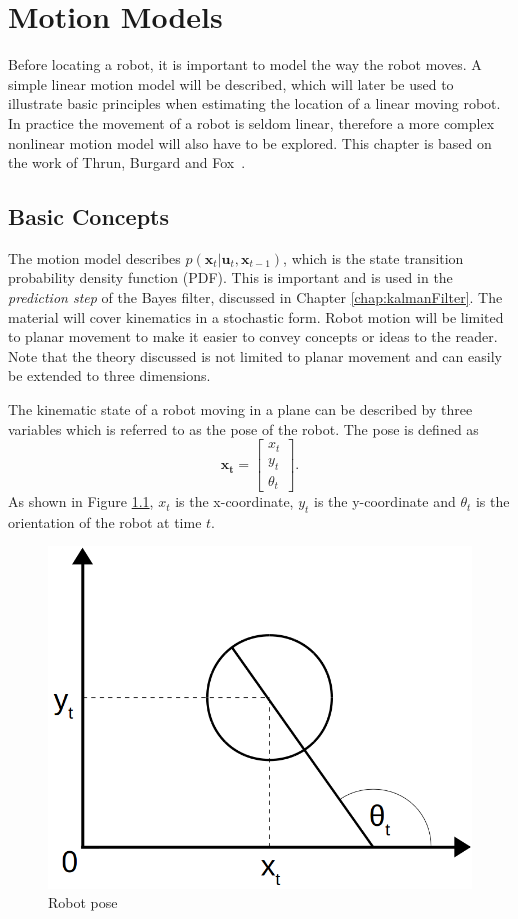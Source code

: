 \documentclass[12pt,oneside,openany,a4paper, %
afrikaans,english,
]{memoir}
\numberwithin{equation}{chapter}
\begin{document}
\chapter{Motion Models}\label{chap:motionModel}
Before locating a robot, it is important to model the way the robot moves. A simple linear motion model will be described, which will later be used to illustrate basic principles when estimating the location of a linear moving robot. In practice the movement of a robot is seldom linear, therefore a more complex nonlinear motion model will also have to be explored. This chapter is based on the work of Thrun, Burgard and Fox~\citep{thrun}.
\section{Basic Concepts}
The motion model describes $p(\bm{x}_t|\bm{u}_t,\bm{x}_{t-1})$, which is the state transition probability density function (PDF). This is important and is used in the \textit{prediction step} of the Bayes filter, discussed in Chapter \ref{chap:kalmanFilter}. The material will cover kinematics in a stochastic form. Robot motion will be limited to planar movement to make it easier to convey concepts or ideas to the reader. Note that the theory discussed is not limited to planar movement and can easily be extended to three dimensions.

The kinematic state of a robot moving in a plane can be described by three variables which is referred to as the pose of the robot.
The pose is defined as
\begin{equation}
\bm{x_t} =
\begin{bmatrix}
x_t\\
y_t\\
\theta_t
\end{bmatrix}.
\end{equation}
As shown in Figure \ref{fig:pose_robot}, $x_t$ is the x-coordinate, $y_t$ is the y-coordinate and $\theta_t$ is the orientation of the robot at time $t$.

\begin{figure}[H]
  \includegraphics[width=0.4\linewidth]{Figures/pose_robot.png}
  \centering
  \caption{Robot pose}
  \label{fig:pose_robot}
\end{figure}
\end{document}

